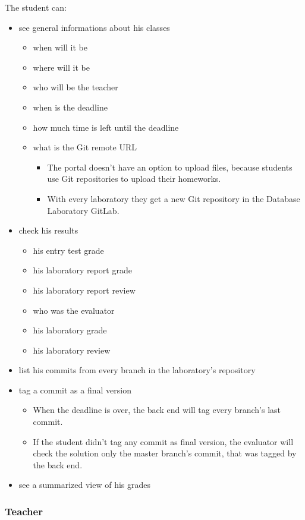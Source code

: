 The student can:

\begin{itemize}
	\item see general informations about his classes
	\begin{itemize}
		\item when will it be
		\item where will it be
		\item who will be the teacher
		\item when is the deadline
		\item how much time is left until the deadline
		\item what is the Git remote URL
		\begin{itemize}
			\item The portal doesn't have an option to upload files, because students use Git repositories to upload their homeworks.
			\item With every laboratory they get a new Git repository in the Database Laboratory GitLab.
		\end{itemize}
	\end{itemize}
	\item check his results
	\begin{itemize}
		\item his entry test grade
		\item his laboratory report grade
		\item his laboratory report review
		\item who was the evaluator
		\item his laboratory grade
		\item his laboratory review
	\end{itemize}
	\item list his commits from every branch in the laboratory's repository
	\item tag a commit as a final version
	\begin{itemize}
		\item When the deadline is over, the back end will tag every branch's last commit.
		\item If the student didn't tag any commit as final version, the evaluator will check the solution only the master branch's commit, that was tagged by the back end.
	\end{itemize}
	\item see a summarized view of his grades
\end{itemize}

\subsubsection{Teacher}

